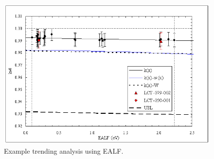 
\begin{figure}[htp] 
    \centering
    \includegraphics[keepaspectratio, width = 5 in]{images/trend_ealf}
    \caption{Example trending analysis using EALF.}
    \label{fig:trend_ealf}
\end{figure}


